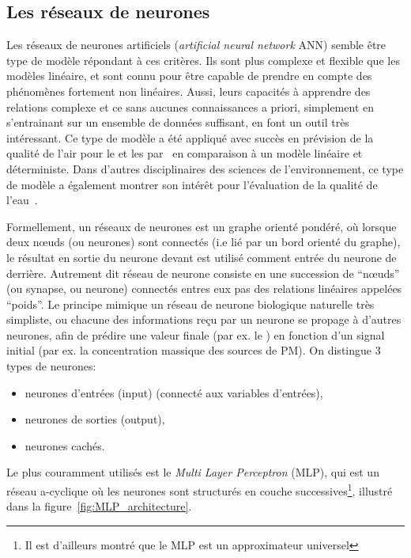 \subsection{Les réseaux de neurones}%
\label{sub:les_réseaux_de_neurones}

Les réseaux de neurones artificiels (\textit{artificial neural network} ANN) semble être
type de modèle répondant à ces critères. Ils sont plus complexe et flexible que les
modèles linéaire, et sont connu pour être capable de prendre en compte des phénomènes
fortement non linéaires. Aussi, leurs capacités à apprendre des relations complexe et ce
sans aucunes connaissances a priori, simplement en s'entrainant sur un ensemble de données
suffisant, en font un outil très intéressant.
Ce type de modèle a été appliqué avec succès en prévision de la qualité de l'air pour le
 et les \PMdix{} par~\cite{kukkonenExtensive2003} en comparaison à un modèle
linéaire et déterministe. Dans d'autres disciplinaires des sciences de l'environnement, ce
type de modèle a également montrer son intérêt pour l'évaluation de la qualité de
l'eau~\autocite{nathanApplication2017}.

Formellement, un réseaux de neurones est un graphe orienté pondéré, où lorsque deux
nœuds (ou neurones) sont connectés (i.e lié par un bord orienté du graphe), le résultat en
sortie du neurone devant est utilisé comment entrée du neurone de derrière.
Autrement dit réseau de neurone consiste en une succession de ``nœuds'' (ou synapse, ou
neurone) connectés entres eux pas des relations linéaires appelées ``poids''. Le principe
mimique un réseau de neurone biologique naturelle très simpliste, ou chacune des
informations reçu par un neurone se propage à d'autres neurones, afin de prédire une
valeur finale (par ex. le \POv) en fonction d'un signal initial (par ex. la
concentration massique des sources de PM).
On distingue 3 types de neurones:
\begin{itemize}
    \item neurones d'entrées (input) (connecté aux variables d'entrées),
    \item neurones de sorties (output),
    \item neurones cachés.
\end{itemize}
Le plus couramment utilisés est le \textit{Multi Layer Perceptron} (MLP), qui est un
réseau a-cyclique où les neurones sont structurés en couche successives\footnote{Il est
d'ailleurs montré que le MLP est un approximateur universel}, illustré dans la
figure~\ref{fig:MLP_architecture}.

